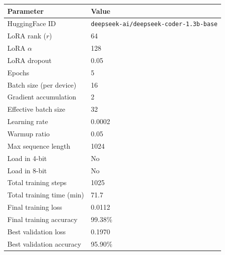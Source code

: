 \documentclass[11pt,a4paper]{article}
\begin{document}
\begin{table}[H]
  \centering
  \begin{tabular}{ll}
    \toprule
    \textbf{Parameter}        & \textbf{Value}                                \\
    \midrule
    HuggingFace ID            & \texttt{deepseek-ai/deepseek-coder-1.3b-base} \\
    LoRA rank ($r$)           & 64                                            \\
    LoRA $\alpha$             & 128                                           \\
    LoRA dropout              & 0.05                                          \\
    Epochs                    & 5                                             \\
    Batch size (per device)   & 16                                            \\
    Gradient accumulation     & 2                                             \\
    Effective batch size      & 32                                            \\
    Learning rate             & 0.0002                                        \\
    Warmup ratio              & 0.05                                          \\
    Max sequence length       & 1024                                          \\
    Load in 4-bit             & No                                            \\
    Load in 8-bit             & No                                            \\
    Total training steps      & 1025                                          \\
    Total training time (min) & 71.7                                          \\
    Final training loss       & 0.0112                                        \\
    Final training accuracy   & 99.38\%                                       \\
    Best validation loss      & 0.1970                                        \\
    Best validation accuracy  & 95.90\%                                       \\
    \bottomrule
  \end{tabular}
\end{table}
\end{document}
